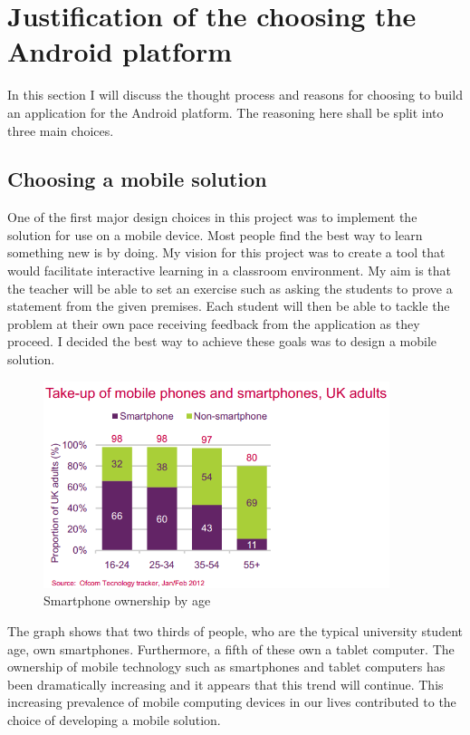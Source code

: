 \section{Justification of the choosing the Android platform}

In this section I will discuss the thought process and reasons for choosing to build an application for the Android platform. The reasoning here shall be split into three main choices.

\subsection{Choosing a mobile solution}

One of the first major design choices in this project was to implement the solution for use on a mobile device.  Most people find the best way to learn something new is by doing. My vision for this project was to create a tool that would facilitate interactive learning in a classroom environment. My aim is that the teacher will be able to set an exercise such as asking the students to prove a statement from the given premises. Each student will then be able to tackle the problem at their own pace receiving feedback from the application as they proceed. I decided the best way to achieve these goals was to design a mobile solution.


\begin{figure}[h]
\centering
\includegraphics[width=0.9\textwidth]{Images/smartphones.png}
\caption{Smartphone ownership by age}
\label{fig:smartphone_barchart}
\end{figure}

The graph shows that two thirds of people, who are the typical university student age, own smartphones. Furthermore, a fifth of these own a tablet computer. \cite{ofcom} The ownership of mobile technology such as smartphones and tablet computers has been dramatically increasing and it appears that this trend will continue. 
This increasing prevalence of mobile computing devices in our lives contributed to the choice of developing a mobile solution.

